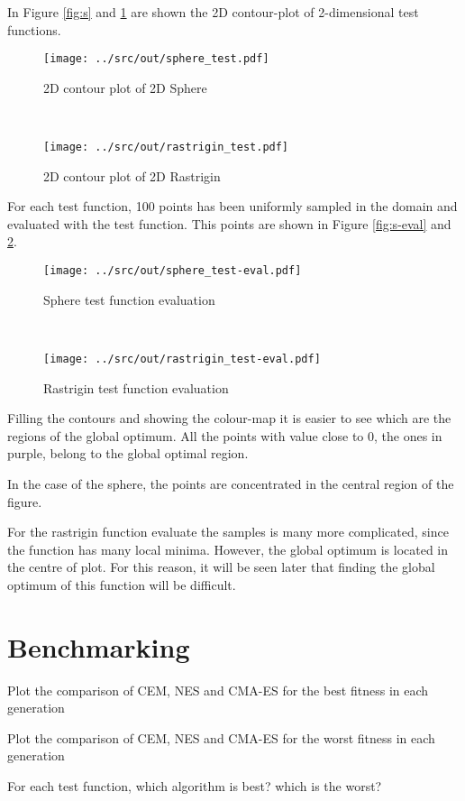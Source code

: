 \documentclass[a4paper,12pt]{article} %
\begin{document}
In Figure \ref{fig:s} and \ref{fig:r} are shown the 2D contour-plot of 2-dimensional test functions.
\begin{figure}[htb]
	\begin{minipage}[b]{.49\textwidth}
		\centering
		\texttt{[image: ../src/out/sphere\_test.pdf]}	
		\caption{2D contour plot of 2D Sphere}
		\label{fig:s}
	\end{minipage}
	~
	\begin{minipage}[b]{.49\textwidth}
		\centering
		\texttt{[image: ../src/out/rastrigin\_test.pdf]}	
		\caption{2D contour plot of 2D Rastrigin}
		\label{fig:r}
	\end{minipage}
\end{figure}

For each test function, 100 points has been uniformly sampled in the domain and evaluated with the test function. This points are shown in Figure \ref{fig:s-eval} and \ref{fig:r-eval}.

\begin{figure}[htb]
	\begin{minipage}[b]{.49\textwidth}
		\centering
		\texttt{[image: ../src/out/sphere\_test-eval.pdf]}	
		\caption{Sphere test function evaluation}
		\label{fig:s-eval}
	\end{minipage}
	~
	\begin{minipage}[b]{.49\textwidth}
		\centering
		\texttt{[image: ../src/out/rastrigin\_test-eval.pdf]}	
		\caption{Rastrigin test function evaluation}
		\label{fig:r-eval}
	\end{minipage}
\end{figure}
 
Filling the contours and showing the colour-map it is easier to see which are the regions of the global optimum. All the points with value close to 0, the ones in purple, belong to the global optimal region.

In the case of the sphere, the points are concentrated in the central region of the figure. 

For the rastrigin function evaluate the samples is many more complicated, since the function has many local minima. However, the global optimum is located in the centre of plot. For this reason, it will be seen later that finding the global optimum of this function will be difficult.
 




	
			
\section{Benchmarking}
Plot the comparison of CEM, NES and CMA-ES for the best fitness in each generation

Plot the comparison of CEM, NES and CMA-ES for the worst fitness in each generation

For each test function, which algorithm is best? which is the worst?
\end{document}

